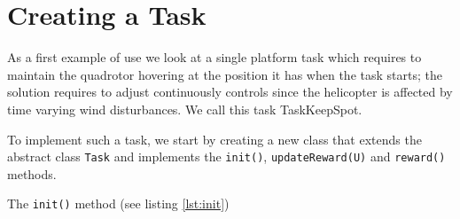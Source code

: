 \documentclass[a4paper,11pt]{report}
\begin{document}
\section{Creating a Task}  \label{sec:createtask}

As a first example of use we look at a single platform task which requires to maintain the quadrotor hovering at the position it has when the task starts; the solution requires to adjust continuously controls since the helicopter is affected by time varying wind disturbances. We call this task TaskKeepSpot. 
 
To implement such a task, we start by creating a new class that extends the abstract class \texttt{Task} and implements the \texttt{init()}, \texttt{updateReward(U)}  and \texttt{reward()} methods.

The \texttt{init()} method (see listing \ref{lst:init}) 
\end{document}
